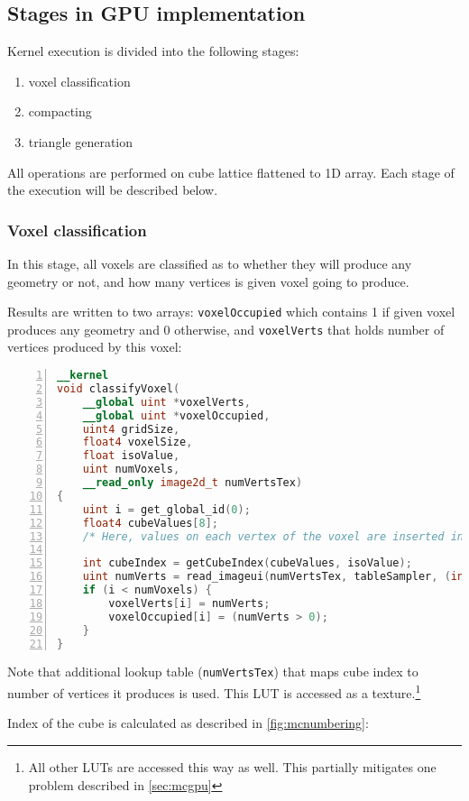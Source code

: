 \subsection{Stages in GPU implementation}
Kernel execution is divided into the following stages:
\begin{enumerate}
  \item voxel classification
  \item compacting
  \item triangle generation
\end{enumerate}

All operations are performed on cube lattice flattened to 1D array. Each stage
of the execution will be described below.

\subsubsection{Voxel classification}

In this stage, all voxels are classified as to whether they will produce any
geometry or not, and how many vertices is given voxel going to produce.

Results are written to two arrays: \texttt{voxelOccupied} which contains 1
if given voxel produces any geometry and 0 otherwise, and
\texttt{voxelVerts} that holds number of vertices produced by this voxel:
\begin{lstlisting}[language=opencl, numbers=left]
__kernel
void classifyVoxel(
	__global uint *voxelVerts,
	__global uint *voxelOccupied,
	uint4 gridSize,
	float4 voxelSize,
	float isoValue,
	uint numVoxels,
	__read_only image2d_t numVertsTex)
{
	uint i = get_global_id(0);
	float4 cubeValues[8];
	/* Here, values on each vertex of the voxel are inserted into cubeValues array */

	int cubeIndex = getCubeIndex(cubeValues, isoValue);
	uint numVerts = read_imageui(numVertsTex, tableSampler, (int2)(cubeIndex, 0)).x;
	if (i < numVoxels) {
		voxelVerts[i] = numVerts;
		voxelOccupied[i] = (numVerts > 0);
	}
}
\end{lstlisting}
Note that additional lookup table (\texttt{numVertsTex}) that maps cube index to
number of vertices it produces is used. This LUT is accessed as a texture.\footnote{All other
  LUTs are accessed this way as well. This partially mitigates one problem
  described in \autoref{sec:mcgpu}
}

Index of the cube is calculated as described in \autoref{fig:mcnumbering}:

